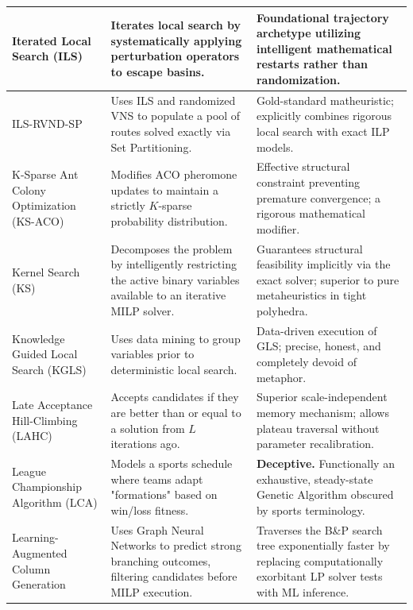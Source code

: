 \begin{center}
\begin{longtable}{
  >{\raggedright\arraybackslash}p{}
  >{\raggedright\arraybackslash}p{}
  >{\raggedright\arraybackslash}p{}
}
Iterated Local Search (ILS) & Iterates local search by systematically applying perturbation operators to escape basins. & Foundational trajectory archetype utilizing intelligent mathematical restarts rather than randomization. \\ \midrule

ILS-RVND-SP & Uses ILS and randomized VNS to populate a pool of routes solved exactly via Set Partitioning. & Gold-standard matheuristic; explicitly combines rigorous local search with exact ILP models. \\ \midrule

K-Sparse Ant Colony Optimization (KS-ACO) & Modifies ACO pheromone updates to maintain a strictly $K$-sparse probability distribution. & Effective structural constraint preventing premature convergence; a rigorous mathematical modifier. \\ \midrule

Kernel Search (KS) & Decomposes the problem by intelligently restricting the active binary variables available to an iterative MILP solver. & Guarantees structural feasibility implicitly via the exact solver; superior to pure metaheuristics in tight polyhedra. \\ \midrule

Knowledge Guided Local Search (KGLS) & Uses data mining to group variables prior to deterministic local search. & Data-driven execution of GLS; precise, honest, and completely devoid of metaphor. \\ \midrule

Late Acceptance Hill-Climbing (LAHC) & Accepts candidates if they are better than or equal to a solution from $L$ iterations ago. & Superior scale-independent memory mechanism; allows plateau traversal without parameter recalibration. \\ \midrule

League Championship Algorithm (LCA) & Models a sports schedule where teams adapt "formations" based on win/loss fitness. & \textbf{Deceptive.} Functionally an exhaustive, steady-state Genetic Algorithm obscured by sports terminology. \\ \midrule

Learning-Augmented Column Generation & Uses Graph Neural Networks to predict strong branching outcomes, filtering candidates before MILP execution. & Traverses the B\&P search tree exponentially faster by replacing computationally exorbitant LP solver tests with ML inference. \\ \midrule


\end{longtable}
\end{center}
